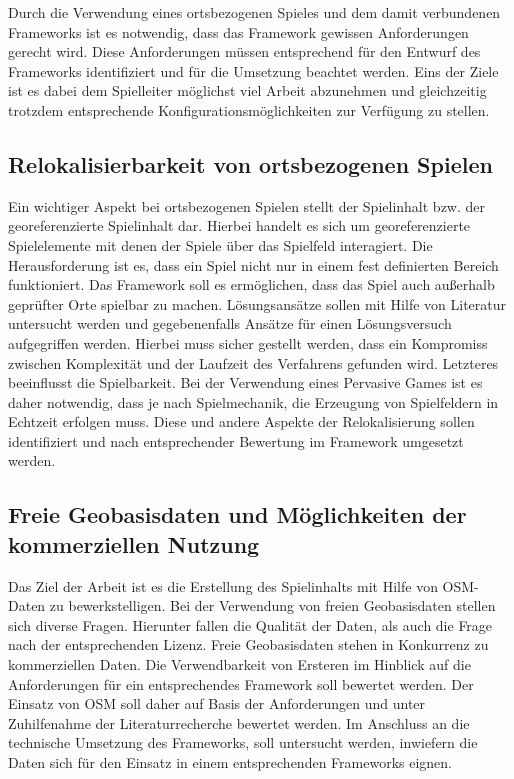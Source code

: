 Durch die Verwendung eines ortsbezogenen Spieles und dem damit verbundenen Frameworks ist es notwendig, dass das Framework gewissen Anforderungen gerecht wird. Diese Anforderungen müssen entsprechend für den Entwurf des Frameworks identifiziert und für die Umsetzung beachtet werden. Eins der Ziele ist es dabei dem Spielleiter möglichst viel Arbeit abzunehmen und gleichzeitig trotzdem entsprechende Konfigurationsmöglichkeiten zur Verfügung zu stellen.

\subsection*{Relokalisierbarkeit von ortsbezogenen Spielen}

Ein wichtiger Aspekt bei ortsbezogenen Spielen stellt der Spielinhalt bzw. der georeferenzierte Spielinhalt dar. Hierbei handelt es sich um georeferenzierte Spielelemente mit denen der Spiele über das Spielfeld interagiert. Die Herausforderung ist es, dass ein Spiel nicht nur in einem fest definierten Bereich funktioniert. Das Framework soll es ermöglichen, dass das Spiel auch außerhalb geprüfter Orte spielbar zu machen. Lösungsansätze sollen mit Hilfe von Literatur untersucht werden und gegebenenfalls Ansätze für einen Lösungsversuch aufgegriffen werden. Hierbei muss sicher gestellt werden, dass ein Kompromiss zwischen Komplexität und der Laufzeit des Verfahrens gefunden wird. Letzteres beeinflusst die Spielbarkeit. Bei der Verwendung eines Pervasive Games ist es daher notwendig, dass je nach Spielmechanik, die Erzeugung von Spielfeldern in Echtzeit erfolgen muss. Diese und andere Aspekte der Relokalisierung sollen identifiziert und nach entsprechender Bewertung im Framework umgesetzt werden.

\subsection*{Freie Geobasisdaten und Möglichkeiten der kommerziellen Nutzung}

Das Ziel der Arbeit ist es die Erstellung des Spielinhalts mit Hilfe von OSM-Daten zu bewerkstelligen.
Bei der Verwendung von freien Geobasisdaten stellen sich diverse Fragen. Hierunter fallen die Qualität der Daten, als auch die Frage nach der entsprechenden Lizenz. Freie Geobasisdaten stehen in Konkurrenz zu kommerziellen Daten. Die Verwendbarkeit von Ersteren im Hinblick auf die Anforderungen für ein entsprechendes Framework soll bewertet werden.
Der Einsatz von OSM soll daher auf Basis der Anforderungen und unter Zuhilfenahme der Literaturrecherche bewertet werden. Im Anschluss an die technische Umsetzung des Frameworks, soll untersucht werden, inwiefern die Daten sich für den Einsatz in einem entsprechenden Frameworks eignen.
